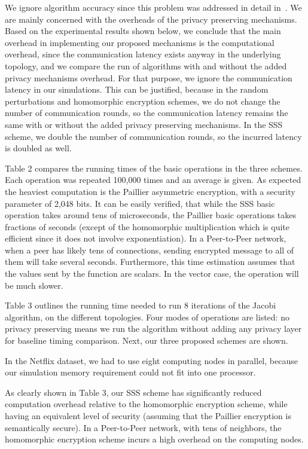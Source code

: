 \documentclass[times, 10pt,twocolumn]{article}
\begin{document}
We ignore algorithm accuracy since this problem was addressed in
detail in~\cite{KorenCF}. We are mainly concerned with the
overheads of the privacy preserving mechanisms. Based on the
experimental results shown below, we conclude that the main
overhead in implementing our proposed mechanisms is the
computational overhead, since the communication latency exists
anyway in the underlying topology, and we compare the run of
algorithms with and without the added privacy mechanisms overhead.
For that purpose, we ignore the communication latency in our
simulations. This can be justified, because in the random
perturbations and homomorphic encryption schemes, we do not change
the number of communication rounds, so the communication latency
remains the same with or without the added privacy preserving
mechanisms. In the SSS scheme, we double the number of
communication rounds, so the incurred latency is doubled as well.

Table 2 compares the running times of the basic operations in the
three schemes. Each operation was repeated 100,000 times and an
average is given. As expected the heaviest computation is the
Paillier asymmetric encryption, with a security parameter of 2,048
bits. It can be easily verified, that while the SSS basic
operation takes around tens of microseconds, the Paillier basic
operations takes fractions of seconds (except of the homomorphic
multiplication which is quite efficient since it does not involve
exponentiation). In a Peer-to-Peer network, when a peer has likely
tens of connections, sending encrypted message to all of them will
take several seconds. Furthermore, this time estimation assumes
that the values sent by the function are scalars. In the vector
case, the operation will be much slower.

Table 3 outlines the running time needed to run 8 iterations of
the Jacobi algorithm, on the different topologies. Four modes of
operations are listed: no privacy preserving means we run the
algorithm without adding any privacy layer for baseline timing
comparison. Next, our three proposed schemes are shown.

In the Netflix dataset, we had to use eight computing nodes in
parallel, because our simulation memory requirement could not fit
into one processor.

As clearly shown in Table 3, our SSS scheme has significantly
reduced computation overhead relative to the homomorphic
encryption scheme, while having an equivalent level of security
(assuming that the Paillier encryption is semantically secure). In
a Peer-to-Peer network, with tens of neighbors, the homomorphic
encryption scheme incurs a high overhead on the computing nodes.
\end{document}

